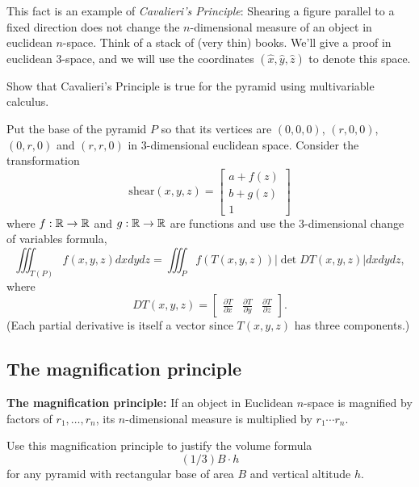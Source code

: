 \documentclass[hints,handout,noauthor,nooutcomes,12pt]{ximera}
\begin{document}
This fact is an example of \textit{Cavalieri's Principle}: Shearing a
figure parallel to a fixed direction does not change the
$n$-dimensional measure of an object in euclidean $n$-space. Think of
a stack of (very thin) books. We'll give a proof in euclidean $3$-space,
and we will use the coordinates $(\hat{x},\hat{y},\hat{z})$ to denote
this space. 






\begin{problem}
Show that Cavalieri's Principle is true for the pyramid using
multivariable calculus.

\begin{hint}
Put the base of the pyramid $P$ so that its vertices are $\left(
0,0,0\right) $, $\left( r,0,0\right) $, $\left( 0,r,0\right) $ and
$\left( r,r,0\right) $ in $3$-dimensional euclidean space. Consider
the transformation%
\[
\mathrm{shear}(x,y,z)=
\begin{bmatrix}
a+ f(z)\\
b+g(z)\\
1
\end{bmatrix}
\]
where $f:\mathbb R\to\mathbb R$ and $g:\mathbb R\to\mathbb R$ are functions and use the
3-dimensional change of variables formula,
$$\iiint_{T(P)} f(x,y,z)dxdydz=\iiint_P f(T(x,y,z))\lvert\det DT(x,y,z)\rvert dxdydz,$$
where
$$DT(x,y,z)=\begin{bmatrix}
\frac{\partial T}{\partial x} & \frac{\partial T}{\partial y} & \frac{\partial T}{\partial z}
\end{bmatrix}.$$
(Each partial derivative is itself a vector since $T(x,y,z)$ has three
components.)
\end{hint}



\end{problem}

\subsection{The magnification principle}

\textbf{The magnification principle:} If an object in Euclidean $n$-space is
magnified by factors of $r_{1},\ldots,r_{n}$, its $n$-dimensional
measure is multiplied by $r_{1}\cdots r_{n}$.

\begin{problem}
Use this magnification principle to justify the volume formula%
\[
(1/3)B\cdot h
\]
for any pyramid with rectangular base of area $B$ and vertical altitude $h$.
\end{problem}
\end{document}
